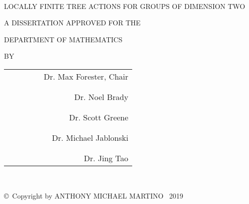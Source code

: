 \documentclass[12pt,parskip=full]{report}
\theoremstyle{plain}
\theoremstyle{definition}
\begin{document}
{{%
\newpage
\thispagestyle{empty}
\ \vspace{0.25in}
\begin{center}
{%
\uppercase{locally finite tree actions for groups of dimension two}
\par
\vspace{0.17in}

\par
\vspace{0.5in}

\uppercase{A dissertation approved for the}
\par
\uppercase{Department of Mathematics}
\par
\vspace{1in}
\uppercase{by}
\par
\vspace{2in}
\begin{flushright}
\begin{tabular}{cr}
\  \  \  \  \  \  \  & Dr. Max Forester, Chair\\
  \\ &  \\
  & Dr. Noel Brady \\
 \\ &  \\
 & Dr. Scott Greene \\
 \\ &  \\
 & Dr. Michael Jablonski \\
  \\ &  \\
   & Dr. Jing Tao \\
\end{tabular}
\end{flushright}
} 
\end{center}


\newpage
\thispagestyle{empty}
\   \
\par
\vfill
\begin{center}
\copyright \    Copyright by \uppercase{Anthony Michael Martino} \   2019


\end{center}}}
\end{document}
